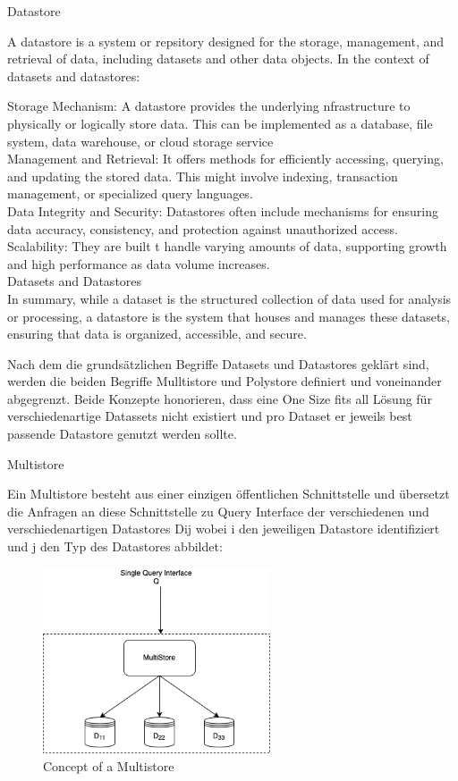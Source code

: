 Datastore

A datastore is a system or repsitory designed for the storage, management, and retrieval of data, including datasets and other data objects. In the context of datasets and datastores:

Storage Mechanism: A datastore provides the underlying nfrastructure to physically or logically store data. This can be implemented as a database, file system, data warehouse, or cloud storage service\newline
\\
    Management and Retrieval: It offers methods for efficiently accessing, querying, and updating the stored data. This might involve indexing, transaction management, or specialized query languages.
\\
    Data Integrity and Security: Datastores often include mechanisms for ensuring data accuracy, consistency, and protection against unauthorized access.
\\
    Scalability: They are built t handle varying amounts of data, supporting growth and high performance as data volume increases.
\\

Datasets and Datastores\\

In summary, while a dataset is the structured collection of data used for analysis or processing, 
a datastore is the system that houses and manages these datasets, ensuring that data is organized, accessible, and secure.

Nach dem die grundsätzlichen Begriffe Datasets und Datastores geklärt sind, werden die beiden Begriffe Mulltistore und 
Polystore definiert und voneinander abgegrenzt. Beide Konzepte honorieren, dass eine One Size fits all Lösung für 
verschiedenartige Datassets nicht existiert und pro Dataset er jeweils best passende Datastore genutzt werden sollte.


Multistore

Ein Multistore besteht aus einer einzigen öffentlichen Schnittstelle und übersetzt die Anfragen an diese 
Schnittstelle zu Query Interface der verschiedenen und verschiedenartigen Datastores Dij wobei i den jeweiligen Datastore
identifiziert und j den Typ des Datastores abbildet:

\begin{figure}[htbp]
    \centering
    \includegraphics[width=0.60\textwidth]{gfx/examples/master_thesis-multistore.png}
    \caption{Concept of a Multistore}
    \label{fig:multistore}
\end{figure} 



